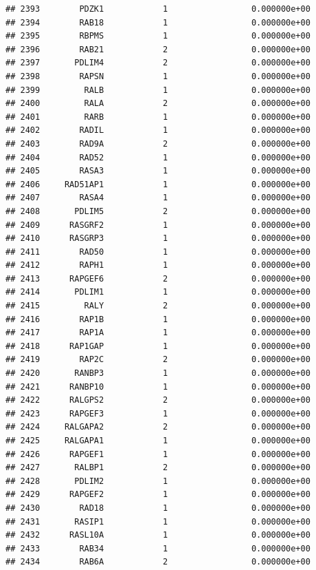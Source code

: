 \documentclass[
]{article}
\begin{document}
\begin{verbatim}
## 2393        PDZK1            1                 0.000000e+00
## 2394        RAB18            1                 0.000000e+00
## 2395        RBPMS            1                 0.000000e+00
## 2396        RAB21            2                 0.000000e+00
## 2397       PDLIM4            2                 0.000000e+00
## 2398        RAPSN            1                 0.000000e+00
## 2399         RALB            1                 0.000000e+00
## 2400         RALA            2                 0.000000e+00
## 2401         RARB            1                 0.000000e+00
## 2402        RADIL            1                 0.000000e+00
## 2403        RAD9A            2                 0.000000e+00
## 2404        RAD52            1                 0.000000e+00
## 2405        RASA3            1                 0.000000e+00
## 2406     RAD51AP1            1                 0.000000e+00
## 2407        RASA4            1                 0.000000e+00
## 2408       PDLIM5            2                 0.000000e+00
## 2409      RASGRF2            1                 0.000000e+00
## 2410      RASGRP3            1                 0.000000e+00
## 2411        RAD50            1                 0.000000e+00
## 2412        RAPH1            1                 0.000000e+00
## 2413      RAPGEF6            2                 0.000000e+00
## 2414       PDLIM1            1                 0.000000e+00
## 2415         RALY            2                 0.000000e+00
## 2416        RAP1B            1                 0.000000e+00
## 2417        RAP1A            1                 0.000000e+00
## 2418      RAP1GAP            1                 0.000000e+00
## 2419        RAP2C            2                 0.000000e+00
## 2420       RANBP3            1                 0.000000e+00
## 2421      RANBP10            1                 0.000000e+00
## 2422      RALGPS2            2                 0.000000e+00
## 2423      RAPGEF3            1                 0.000000e+00
## 2424     RALGAPA2            2                 0.000000e+00
## 2425     RALGAPA1            1                 0.000000e+00
## 2426      RAPGEF1            1                 0.000000e+00
## 2427       RALBP1            2                 0.000000e+00
## 2428       PDLIM2            1                 0.000000e+00
## 2429      RAPGEF2            1                 0.000000e+00
## 2430        RAD18            1                 0.000000e+00
## 2431       RASIP1            1                 0.000000e+00
## 2432      RASL10A            1                 0.000000e+00
## 2433        RAB34            1                 0.000000e+00
## 2434        RAB6A            2                 0.000000e+00

\end{verbatim}
\end{document}
